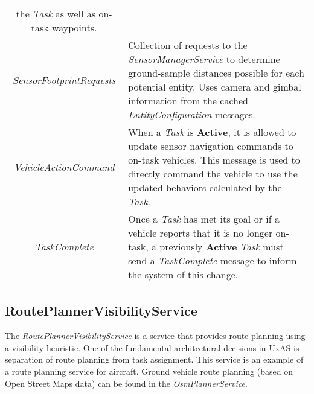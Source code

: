 \begin{longtable}[]{@{}cl@{}}
\begin{minipage}[t]{0.55\columnwidth}
the \emph{Task} as well as on-task waypoints.\strut
\end{minipage}\tabularnewline
\begin{minipage}[t]{0.40\columnwidth}\centering\strut
\emph{SensorFootprintRequests}\strut
\end{minipage} & \begin{minipage}[t]{0.55\columnwidth}\raggedright\strut
Collection of requests to the \emph{SensorManagerService} to determine
ground-sample distances possible for each potential entity. Uses camera
and gimbal information from the cached \emph{EntityConfiguration}
messages.\strut
\end{minipage}\tabularnewline
\begin{minipage}[t]{0.40\columnwidth}\centering\strut
\emph{VehicleActionCommand}\strut
\end{minipage} & \begin{minipage}[t]{0.55\columnwidth}\raggedright\strut
When a \emph{Task} is \textbf{Active}, it is allowed to update sensor
navigation commands to on-task vehicles. This message is used to
directly command the vehicle to use the updated behaviors calculated by
the \emph{Task}.\strut
\end{minipage}\tabularnewline
\begin{minipage}[t]{0.40\columnwidth}\centering\strut
\emph{TaskComplete}\strut
\end{minipage} & \begin{minipage}[t]{0.55\columnwidth}\raggedright\strut
Once a \emph{Task} has met its goal or if a vehicle reports that it is
no longer on-task, a previously \textbf{Active} \emph{Task} must send a
\emph{TaskComplete} message to inform the system of this change.\strut
\end{minipage}\tabularnewline
\bottomrule
\end{longtable}

\subsection{RoutePlannerVisibilityService}\label{routeplannervisibilityservice}

The \emph{RoutePlannerVisibilityService} is a service that provides
route planning using a visibility heuristic. One of the fundamental
architectural decisions in UxAS is separation of route planning from
task assignment. This service is an example of a route planning service
for aircraft. Ground vehicle route planning (based on Open Street Maps
data) can be found in the \emph{OsmPlannerService}.

